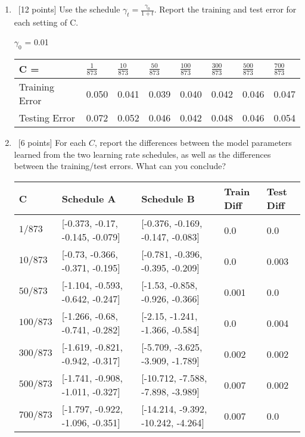 \documentclass[12pt, fullpage,letterpaper]{article}
\begin{document}
\begin{enumerate}
\begin{enumerate}
		\item~[12 points] Use the schedule $\gamma_t = \frac{\gamma_0}{1+t}$. Report the training and test error for each setting of C. 
		
		\bigskip
		$\gamma_0$ = 0.01
		\begin{table}[h]
			\begin{tabular}{l||lllllll}
				C = & $\frac{1}{873}$ & $\frac{10}{873}$ & $\frac{50}{873}$ & $\frac{100}{873}$ & $\frac{300}{873}$ & $\frac{500}{873}$ & $\frac{700}{873}$ \\
				\hline\hline
				Training Error &0.050 & 0.041 & 0.039 & 0.040 & 0.042 & 0.046 & 0.047 \\
				Testing Error & 0.072 & 0.052 & 0.046 & 0.042 & 0.048 & 0.046 & 0.054 \\
			\end{tabular}
		\end{table}
		
		\item~[6 points] For each $C$, report the differences between the model parameters learned from the two learning rate schedules, as well as the differences between the training/test errors. What can you conclude? 
		
		\begin{table}[h]
			\begin{tabular}{l||llll}
				C & Schedule A & Schedule B & Train Diff & Test Diff\\
				\hline\hline
				$1/873$ & [-0.373, -0.17, -0.145, -0.079] & [-0.376, -0.169, -0.147, -0.083] & 0.0 & 0.0\\
				$10/873$ & [-0.73, -0.366, -0.371, -0.195] & [-0.781, -0.396, -0.395, -0.209] & 0.0 & 0.003 \\
				$50/873$ & [-1.104, -0.593, -0.642, -0.247] & [-1.53, -0.858, -0.926, -0.366] & 0.001 & 0.0 \\
				$100/873$ & [-1.266, -0.68, -0.741, -0.282] & [-2.15, -1.241, -1.366, -0.584] & 0.0 & 0.004 \\
				$300/873$ & [-1.619, -0.821, -0.942, -0.317] & [-5.709, -3.625, -3.909, -1.789] & 0.002 & 0.002 \\
				$500/873$ & [-1.741, -0.908, -1.011, -0.327] & [-10.712, -7.588, -7.898, -3.989] & 0.007 & 0.002 \\
				$700/873$ & [-1.797, -0.922, -1.096, -0.351] & [-14.214, -9.392, -10.242, -4.264] & 0.007 & 0.0 \\
			\end{tabular}
		\end{table}
	

\end{enumerate}
\end{enumerate}
\end{document}

